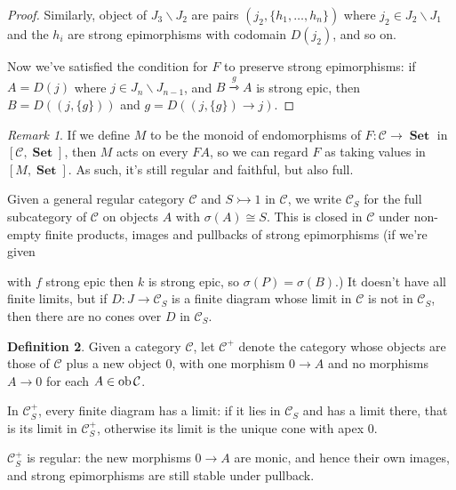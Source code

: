 \documentclass[a4paper]{article}
\theoremstyle{definition}
\newtheorem{definition}{Definition}
\theoremstyle{remark}
\newtheorem{remark}[definition]{Remark}
\theoremstyle{default}
\numberwithin{definition}{section}
\newcommand*\ob[1]{\textnormal{ob}\,#1}
\DeclareMathOperator{\Set}{\textbf{Set}}
\begin{document}
\begin{proof}
	Similarly, object of $J_3 \backslash J_2$ are pairs $(j_2, \{h_1, \dots, h_n\})$
	where $j_2 \in J_2 \backslash J_1$ and the $h_i$ are strong epimorphisms with codomain $D(j_2)$,
	and so on.
	
	Now we've satisfied the condition for $F$ to preserve strong epimorphisms:
	if $A = D(j)$ where $j \in J_n \backslash J_{n-1}$,
	and $B \overset{g}{\rightarrowtriangle} A$ is strong epic,
	then $B = D((j, \{g\}))$ and $g = D((j, \{g\}) \to j)$.
\end{proof}

\begin{remark}
	If we define $M$ to be the monoid of endomorphisms of $F: \mathcal{C} \to \Set$ in $[\mathcal{C}, \Set]$,
	then $M$ acts on every $FA$, 
	so we can regard $F$ as taking values in $[M, \Set]$.
	As such, it's still regular and faithful, but also full.
	\label{611}
\end{remark}

Given a general regular category $\mathcal{C}$ and $S \rightarrowtail 1$ in $\mathcal{C}$,
we write $\mathcal{C}_S$ for the full subcategory of $\mathcal{C}$ on objects $A$ with $\sigma(A) \cong S$.
This is closed in $\mathcal{C}$ under non-empty finite products, images and pullbacks of strong epimorphisms
(if we're given
with $f$ strong epic then $k$ is strong epic, so $\sigma(P) = \sigma(B)$.)
It doesn't have all finite limits,
but if $D: J \to \mathcal{C}_S$ is a finite diagram whose limit in $\mathcal{C}$ is not in $\mathcal{C}_S$,
then there are no cones over $D$ in $\mathcal{C}_S$.

\begin{definition}
	Given a category $\mathcal{C}$,
	let $\mathcal{C}^+$ denote the category whose objects are those of $\mathcal{C}$ plus a new object $0$,
	with one morphism $0 \to A$ and no morphisms $A \to 0$ for each $A \in \ob \mathcal{C}$.
\end{definition}

In $\mathcal{C}_S^+$, every finite diagram has a limit:
if it lies in $\mathcal{C}_S$ and has a limit there, that is its limit in $\mathcal{C}_S^+$,
otherwise its limit is the unique cone with apex 0.

$\mathcal{C}_S^+$ is regular: the new morphisms $0 \to A$ are monic,
and hence their own images,
and strong epimorphisms are still stable under pullback.
\end{document}
